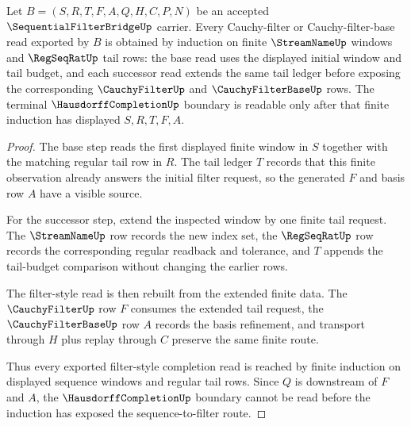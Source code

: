 \begin{theorem}
\label{thm:sequential-filter-bridge-finite-window-induction}
Let $B=(S,R,T,F,A,Q,H,C,P,N)$ be an accepted $\SequentialFilterBridgeUp$ carrier. Every Cauchy-filter or Cauchy-filter-base read exported by $B$ is obtained by induction on finite $\StreamNameUp$ windows and $\RegSeqRatUp$ tail rows: the base read uses the displayed initial window and tail budget, and each successor read extends the same tail ledger before exposing the corresponding $\CauchyFilterUp$ and $\CauchyFilterBaseUp$ rows. The terminal $\HausdorffCompletionUp$ boundary is readable only after that finite induction has displayed $S,R,T,F,A$.
\end{theorem}
\begin{proof}
The base step reads the first displayed finite window in $S$ together with the matching regular tail row in $R$. The tail ledger $T$ records that this finite observation already answers the initial filter request, so the generated $F$ and basis row $A$ have a visible source.

For the successor step, extend the inspected window by one finite tail request. The $\StreamNameUp$ row records the new index set, the $\RegSeqRatUp$ row records the corresponding regular readback and tolerance, and $T$ appends the tail-budget comparison without changing the earlier rows.

The filter-style read is then rebuilt from the extended finite data. The $\CauchyFilterUp$ row $F$ consumes the extended tail request, the $\CauchyFilterBaseUp$ row $A$ records the basis refinement, and transport through $H$ plus replay through $C$ preserve the same finite route.

Thus every exported filter-style completion read is reached by finite induction on displayed sequence windows and regular tail rows. Since $Q$ is downstream of $F$ and $A$, the $\HausdorffCompletionUp$ boundary cannot be read before the induction has exposed the sequence-to-filter route.
\end{proof}

